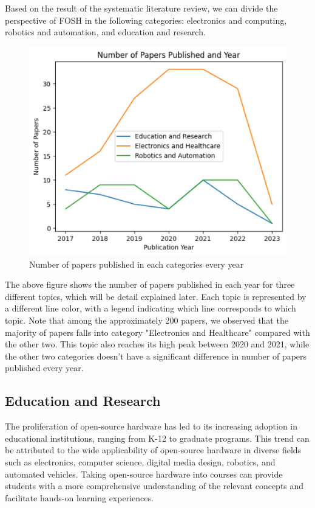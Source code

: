 \documentclass[final-report.tex]{subfiles}
\begin{document}
Based on the result of the systematic literature review, we can divide the perspective of FOSH in the following categories: electronics and computing, robotics and automation, and education and research.

\begin{figure}[!h]
    \begin{minipage}{0.48\textwidth}
        \centering
        \includegraphics[width=\textwidth]{../Images/num_paper_vs_year.png}
        \caption{Number of papers published in each categories every year}
        \label{fig:1}
    \end{minipage}
\end{figure}
The above figure shows the number of papers published in each year for three different topics, which will be detail explained later. Each topic is represented by a different line color, with a legend indicating which line corresponds to which topic. Note that among the approximately 200 papers, we observed that the majority of papers falls into category "Electronics and Healthcare" compared with the other two. This topic also reaches its high peak between 2020 and 2021, while the other two categories doesn't have a significant difference in number of papers published every year. 


\subsection{Education and Research}

The proliferation of open-source hardware has led to its increasing adoption in educational institutions, ranging from K-12 to graduate programs.\cite{martinez2017open}
This trend can be attributed to the wide applicability of open-source hardware in diverse fields such as electronics\cite{papazoglou2017openhardsim}, computer science, digital media design\cite{chen2021research}, robotics\cite{vrochidou2018open}, and automated vehicles\cite{nakamoto2019development}. 
Taking open-source hardware into courses can provide students with a more comprehensive understanding of the relevant concepts and facilitate hands-on learning experiences.\cite{chen2021research}
\end{document}
